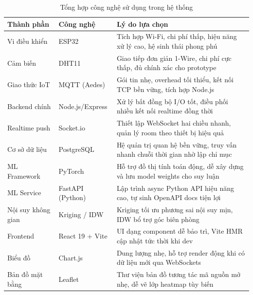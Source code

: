 \begin{table}[H]
  \centering
  \caption{Tổng hợp công nghệ sử dụng trong hệ thống}
  \label{tab:tech_summary}
  \begin{tabularx}{\textwidth}{p{3cm} p{3.2cm} X}
    \toprule
    \textbf{Thành phần} & \textbf{Công nghệ} & \textbf{Lý do lựa chọn} \\
    \midrule
    Vi điều khiển
      & ESP32
      & Tích hợp Wi-Fi, chi phí thấp, hiệu năng xử lý cao, hệ sinh thái phong phú \\
    Cảm biến
      & DHT11
      & Giao tiếp đơn giản 1-Wire, chi phí cực thấp, đủ chính xác cho prototype \\
    Giao thức IoT
      & MQTT (Aedes)
      & Gói tin nhẹ, overhead tối thiểu, kết nối TCP bền vững, tích hợp Node.js \\
    Backend chính
      & Node.js/Express
      & Xử lý bất đồng bộ I/O tốt, điều phối nhiều kết nối realtime đồng thời \\
    Realtime push
      & Socket.io
      & Thiết lập WebSocket hai chiều nhanh, quản lý room theo thiết bị hiệu quả \\
    Cơ sở dữ liệu
      & PostgreSQL
      & Hệ quản trị quan hệ bền vững, truy vấn nhanh chuỗi thời gian nhờ lập chỉ mục \\
    ML Framework
      & PyTorch
      & Hỗ trợ đồ thị tính toán động, dễ xây dựng và lưu model weights cho suy luận \\
    ML Service
      & FastAPI (Python)
      & Lập trình async Python API hiệu năng cao, tự sinh OpenAPI docs tiện lợi \\
    Nội suy không gian
      & Kriging / IDW
      & Kriging tối ưu phương sai nội suy mịn, IDW bổ trợ góc biên phòng \\
    Frontend
      & React 19 + Vite
      & UI dạng component dễ bảo trì, Vite HMR cập nhật tức thời khi dev \\
    Biểu đồ
      & Chart.js
      & Dung lượng nhẹ, hỗ trợ render động khi có dữ liệu mới qua WebSockets \\
    Bản đồ mặt bằng
      & Leaflet
      & Thư viện bản đồ tương tác mã nguồn mở nhẹ, dễ vẽ lớp heatmap tùy biến \\
    \bottomrule
  \end{tabularx}
\end{table}
